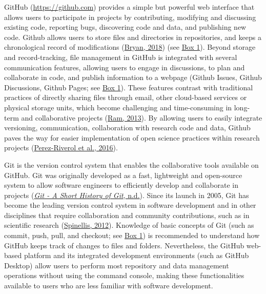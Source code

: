 GitHub (\url{https://github.com}) provides a simple but powerful web interface that allows users to participate in projects by contributing, modifying and discussing existing code, reporting bugs, discovering code and data, and publishing new code.
Github allows users to store files and directories in repositories, and keeps a chronological record of modifications (\protect\hyperlink{ref-RVetqmsg}{Bryan, 2018}) (see \protect\hyperlink{definitions}{Box 1}).
Beyond storage and record-tracking, file management in GitHub is integrated with several communication features, allowing users to engage in discussions, to plan and collaborate in code, and publish information to a webpage (Github Issues, Github Discussions, Github Pages; see \protect\hyperlink{definitions}{Box 1}).
These features contrast with traditional practices of directly sharing files through email, other cloud-based services or physical storage units, which become challenging and time-consuming in long-term and collaborative projects (\protect\hyperlink{ref-4ny1onB0}{Ram, 2013}).
By allowing users to easily integrate versioning, communication, collaboration with research code and data, Github paves the way for easier implementation of open science practices within research projects (\protect\hyperlink{ref-kEX5dgzK}{Perez-Riverol et al., 2016}).

Git is the version control system that enables the collaborative tools available on GitHub.
Git was originally developed as a fast, lightweight and open-source system to allow software engineers to efficiently develop and collaborate in projects (\protect\hyperlink{ref-1CM2EcdVk}{\emph{Git - A Short History of Git}, n.d.}).
Since its launch in 2005, Git has become the leading version control system in software development and in other disciplines that require collaboration and community contributions, such as in scientific research (\protect\hyperlink{ref-7q3wZN6d}{Spinellis, 2012}).
Knowledge of basic concepts of Git (such as commit, push, pull, and checkout; see \protect\hyperlink{definitions}{Box 1}) is recommended to understand how GitHub keeps track of changes to files and folders.
Nevertheless, the GitHub web-based platform and its integrated development environments (such as GitHub Desktop) allow users to perform most repository and data management operations without using the command console, making these functionalities available to users who are less familiar with software development.

